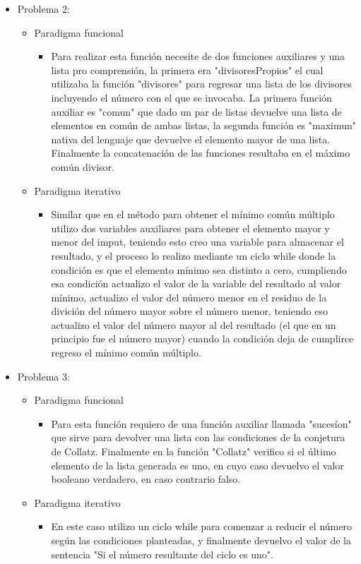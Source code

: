 \documentclass[10pt]{article}
\begin{document}
\begin{titlepage}
\begin{flushleft}
\begin{itemize}
			\item Problema 2:
			\begin{itemize}
				\item Paradigma funcional
				\begin{itemize}
					\item Para realizar esta función necesite de dos funciones auxiliares y una lista pro comprensión, la primera era "divisoresPropios" el cual utilizaba la función "divisores" para regresar una lista de los divisores incluyendo el número con el que se invocaba. La primera función auxiliar es "comun" que dado un par de listas devuelve una lista de elementos en común de ambas listas, la segunda función es "maximun" nativa del lenguaje que devuelve el elemento mayor de una lista. Finalmente la concatenación de las funciones resultaba en el máximo común divisor.
				\end{itemize}
				\item Paradigma iterativo
				\begin{itemize}
					\item Similar que en el método para obtener el mínimo común múltiplo utilizo dos variables auxiliares para obtener el elemento mayor y menor del imput, teniendo esto creo una variable para almacenar el resultado, y el proceso lo realizo mediante un ciclo while donde la condición es que el elemento mínimo sea distinto a cero, cumpliendo esa condición actualizo el valor de la variable del resultado al valor mínimo, actualizo el valor del número menor en el residuo de la divición del número mayor sobre el número menor, teniendo eso actualizo el valor del número mayor al del resultado (el que en un principio fue el número mayor) cuando la condición deja de cumplirce regreso el mínimo común múltiplo.
				\end{itemize}
			\end{itemize}

			\item Problema 3:
			\begin{itemize}
				\item Paradigma funcional
				\begin{itemize}
					\item Para esta función requiero de una función auxiliar llamada "sucesíon" que sirve para devolver una lista con las condiciones de la conjetura de Collatz. Finalmente en la función "Collatz" verifico si el último elemento de la lista generada es uno, en cuyo caso devuelvo el valor booleano verdadero, en caso contrario falso.
				\end{itemize}
				\item Paradigma iterativo
				\begin{itemize}
					\item En este caso utilizo un ciclo while para comenzar a reducir el número según las condiciones planteadas, y finalmente devuelvo el valor de la sentencia "Si el número resultante del ciclo es uno".
				\end{itemize}
			\end{itemize}


\end{itemize}
\end{flushleft}
\end{titlepage}
\end{document}
